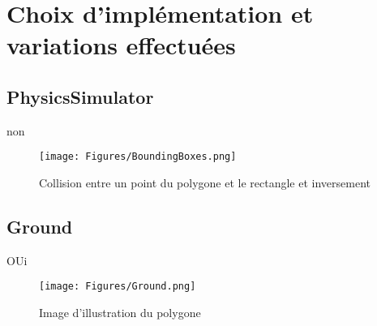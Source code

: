 \section{Choix d'implémentation et variations effectuées}

\subsection{PhysicsSimulator}
non
\begin{figure}[h]
 \centering
 \texttt{[image: Figures/BoundingBoxes.png]}
 \caption{Collision entre un point du polygone et le rectangle et inversement}
 \label{figure:BoundingBoxes}
\end{figure}
\subsection{Ground}
OUi
\begin{figure}[h]
 \centering
 \texttt{[image: Figures/Ground.png]}
 \caption{Image d'illustration du polygone}
 \label{figure:Ground}
\end{figure}
